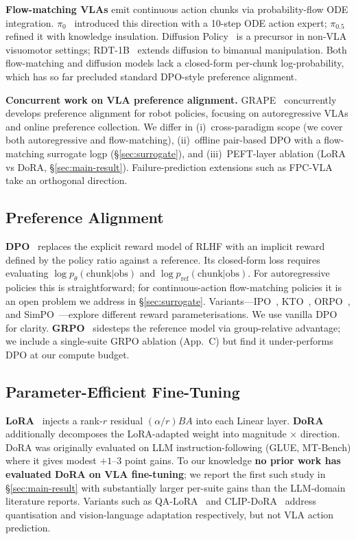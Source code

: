 \documentclass{article}
\begin{document}
\textbf{Flow-matching VLAs} emit continuous action chunks via probability-flow ODE integration. \(\pi_0\)~\cite{black2024pi0} introduced this direction with a 10-step ODE action expert; \(\pi_{0.5}\)~\cite{openpi2025pi05} refined it with knowledge insulation. Diffusion Policy~\cite{chi2023diffusion} is a precursor in non-VLA visuomotor settings; RDT-1B~\cite{liu2024rdt} extends diffusion to bimanual manipulation. Both flow-matching and diffusion models lack a closed-form per-chunk log-probability, which has so far precluded standard DPO-style preference alignment.

\textbf{Concurrent work on VLA preference alignment.} GRAPE~\cite{grape2024} concurrently develops preference alignment for robot policies, focusing on autoregressive VLAs and online preference collection. We differ in (i)~cross-paradigm scope (we cover both autoregressive and flow-matching), (ii)~offline pair-based DPO with a flow-matching surrogate logp (\S\ref{sec:surrogate}), and (iii)~PEFT-layer ablation (LoRA vs DoRA, \S\ref{sec:main-result}). Failure-prediction extensions such as FPC-VLA~\cite{fpcvla2026} take an orthogonal direction.

\subsection{Preference Alignment}

\textbf{DPO}~\cite{rafailov2023direct} replaces the explicit reward model of RLHF with an implicit reward defined by the policy ratio against a reference. Its closed-form loss requires evaluating \(\log p_\theta(\text{chunk}|\text{obs})\) and \(\log p_\text{ref}(\text{chunk}|\text{obs})\). For autoregressive policies this is straightforward; for continuous-action flow-matching policies it is an open problem we address in \S\ref{sec:surrogate}. Variants---IPO~\cite{azar2023ipo}, KTO~\cite{ethayarajh2024kto}, ORPO~\cite{hong2024orpo}, and SimPO~\cite{meng2024simpo}---explore different reward parameterisations. We use vanilla DPO for clarity. \textbf{GRPO}~\cite{shao2024deepseekmath, deepseek2025r1} sidesteps the reference model via group-relative advantage; we include a single-suite GRPO ablation (App.~C) but find it under-performs DPO at our compute budget.

\subsection{Parameter-Efficient Fine-Tuning}

\textbf{LoRA}~\cite{hu2021lora} injects a rank-\(r\) residual \((\alpha/r) BA\) into each Linear layer. \textbf{DoRA}~\cite{liu2024dora} additionally decomposes the LoRA-adapted weight into magnitude \(\times\) direction. DoRA was originally evaluated on LLM instruction-following (GLUE, MT-Bench) where it gives modest \(+1\)--\(3\) point gains. To our knowledge \textbf{no prior work has evaluated DoRA on VLA fine-tuning}; we report the first such study in \S\ref{sec:main-result} with substantially larger per-suite gains than the LLM-domain literature reports. Variants such as QA-LoRA~\cite{xu2024qalora} and CLIP-DoRA~\cite{clipdora2025} address quantisation and vision-language adaptation respectively, but not VLA action prediction.
\end{document}
